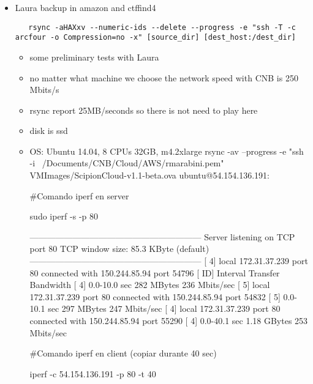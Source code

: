\begin{itemize}
   \item Laura backup in amazon and ctffind4
   \begin{lstlisting}
   rsync -aHAXxv --numeric-ids --delete --progress -e "ssh -T -c arcfour -o Compression=no -x" [source_dir] [dest_host:/dest_dir]
   \end{lstlisting}
   \begin{itemize}
    \item some preliminary tests with Laura
    \item no matter what machine we choose the network speed with CNB is 250 Mbits/s
    \item rsync report 25MB/seconds so there is not need to play here
    \item disk is ssd
    \item OS: Ubuntu 14.04, 8 CPUs 32GB, m4.2xlarge
    rsync -av --progress -e "ssh -i ~/Documents/CNB/Cloud/AWS/rmarabini.pem" VMImages/ScipionCloud-v1.1-beta.ova ubuntu@54.154.136.191:

#Comando iperf en server

sudo iperf -s -p 80

------------------------------------------------------------
Server listening on TCP port 80
TCP window size: 85.3 KByte (default)
------------------------------------------------------------
[  4] local 172.31.37.239 port 80 connected with 150.244.85.94 port 54796
[ ID] Interval       Transfer     Bandwidth
[  4]  0.0-10.0 sec   282 MBytes   236 Mbits/sec
[  5] local 172.31.37.239 port 80 connected with 150.244.85.94 port 54832
[  5]  0.0-10.1 sec   297 MBytes   247 Mbits/sec
[  4] local 172.31.37.239 port 80 connected with 150.244.85.94 port 55290
[  4]  0.0-40.1 sec  1.18 GBytes   253 Mbits/sec


#Comando iperf en client (copiar durante 40 sec)

iperf -c 54.154.136.191 -p 80 -t 40

   \end{itemize}


\end{itemize}
   

